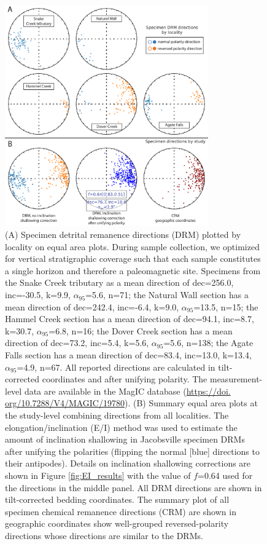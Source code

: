 \begin{figure}[h!]
\centering
\includegraphics[width=0.78\textwidth]{figure/Zhang2024a/in_situ_pmag.pdf}
\caption{\scriptsize (A) Specimen detrital remanence directions (DRM) plotted by locality on equal area plots. During sample collection, we optimized for vertical stratigraphic coverage such that each sample constitutes a single horizon and therefore a paleomagnetic site. Specimens from the Snake Creek tributary as a mean direction of dec=256.0\textdegree, inc=-30.5\textdegree, k=9.9, $\alpha_{95}$=5.6\textdegree, n=71; the Natural Wall section has a mean direction of dec=242.4\textdegree, inc=-6.4\textdegree, k=9.0, $\alpha_{95}$=13.5\textdegree, n=15; the Hammel Creek section has a mean direction of dec=94.1\textdegree, inc=8.7\textdegree, k=30.7, $\alpha_{95}$=6.8\textdegree, n=16; the Dover Creek section has a mean direction of dec=73.2\textdegree, inc=5.4\textdegree, k=5.6, $\alpha_{95}$=5.6\textdegree, n=138; the Agate Falls section has a mean direction of dec=83.4\textdegree, inc=13.0\textdegree, k=13.4, $\alpha_{95}$=4.9\textdegree, n=67. All reported directions are calculated in tilt-corrected coordinates and after unifying polarity. The measurement-level data are available in the MagIC database (\url{https://doi. org/10.7288/V4/MAGIC/19780}). (B) Summary equal area plots at the study-level combining directions from all localities. The elongation/inclination (E/I) method \citep{Tauxe2004b} was used to estimate the amount of inclination shallowing in Jacobsville specimen DRMs after unifying the polarities (flipping the normal [blue] directions to their antipodes). Details on inclination shallowing corrections are shown in Figure \ref{fig:EI_results} with the value of $f$=0.64 used for the directions in the middle panel. All DRM directions are shown in tilt-corrected bedding coordinates. The summary plot of all specimen chemical remanence directions (CRM) are shown in geographic coordinates show well-grouped reversed-polarity directions whose directions are similar to the DRMs. }
\label{fig:in_situ_pmag}
\end{figure}

